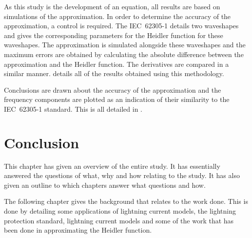 As this study is the development of an equation, all results are based on simulations of the approximation. In order to determine the accuracy of the approximation, a control is required. The IEC~62305-1 details two waveshapes and gives the corresponding parameters for the Heidler function for these waveshapes. The approximation is simulated alongside these waveshapes and the maximum errors are obtained by calculating the absolute difference between the approximation and the Heidler function. The derivatives are compared in a similar manner.  details all of the results obtained using this methodology.

Conclusions are drawn about the accuracy of the approximation and the frequency components are plotted as an indication of their similarity to the IEC~62305-1 standard. This is all detailed in .


\section{Conclusion}
\label{sec:approach_conclusion}
This chapter has given an overview of the entire study. It has essentially answered the questions of what, why and how relating to the study. It has also given an outline to which chapters answer what questions and how.

The following chapter gives the background that relates to the work done. This is done by detailing some applications of lightning current models, the lightning protection standard, lightning current models and some of the work that has been done in approximating the Heidler function.
